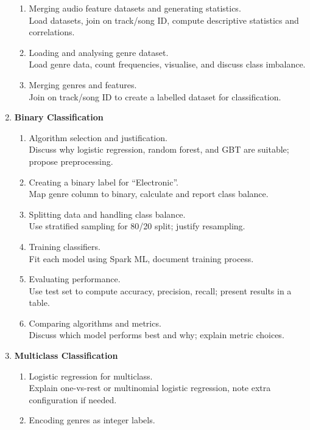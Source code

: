 \begin{enumerate}
    \begin{enumerate}
      \item Merging audio feature datasets and generating statistics.\\
      Load datasets, join on track/song ID, compute descriptive statistics and correlations.
      \item Loading and analysing genre dataset.\\
      Load genre data, count frequencies, visualise, and discuss class imbalance.
      \item Merging genres and features.\\
      Join on track/song ID to create a labelled dataset for classification.
    \end{enumerate}
  \item \textbf{Binary Classification}
    \begin{enumerate}
      \item Algorithm selection and justification.\\
      Discuss why logistic regression, random forest, and GBT are suitable; propose preprocessing.
      \item Creating a binary label for ``Electronic''.\\
      Map genre column to binary, calculate and report class balance.
      \item Splitting data and handling class balance.\\
      Use stratified sampling for 80/20 split; justify resampling.
      \item Training classifiers.\\
      Fit each model using Spark ML, document training process.
      \item Evaluating performance.\\
      Use test set to compute accuracy, precision, recall; present results in a table.
      \item Comparing algorithms and metrics.\\
      Discuss which model performs best and why; explain metric choices.
    \end{enumerate}
  \item \textbf{Multiclass Classification}
    \begin{enumerate}
      \item Logistic regression for multiclass.\\
      Explain one-vs-rest or multinomial logistic regression, note extra configuration if needed.
      \item Encoding genres as integer labels.\\

\end{enumerate}
\end{enumerate}
